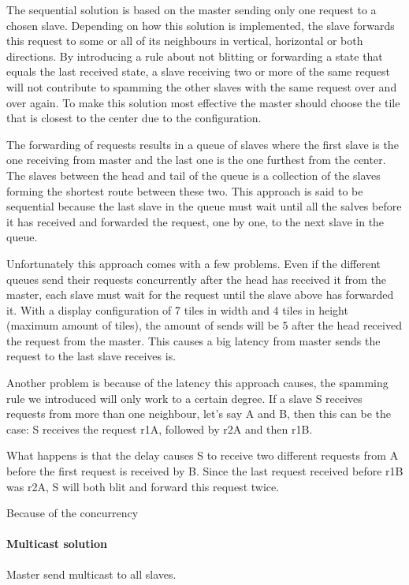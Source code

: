 \documentclass[12pt, a4paper, oneside]{article}
\begin{document}
The sequential solution is based on the master sending only one request to a chosen slave. Depending on how this solution is implemented, the slave forwards this request to some or all of its neighbours in vertical, horizontal or both directions. By introducing a rule about not blitting or forwarding a state that equals the last received state, a slave receiving two or more of the same request will not contribute to spamming the other slaves with the same request over and over again. To make this solution most effective the master should choose the tile that is closest to the center due to the configuration.

The forwarding of requests results in a queue of slaves where the first slave is the one receiving from master and the last one is the one furthest from the center. The slaves between the head and tail of the queue is a collection of the slaves forming the shortest route between these two. 
This approach is said to be sequential because the last slave in the queue must wait until all the salves before it has received and forwarded the request, one by one, to the next slave in the queue.

Unfortunately this approach comes with a few problems. Even if the different queues send their requests concurrently after the head has received it from the master, each slave must wait for the request until the slave above has forwarded it. With a display configuration of 7 tiles in width and 4 tiles in height (maximum amount of tiles), the amount of sends will be 5 after the head received the request from the master. This causes a big latency from master sends the request to the last slave receives is. 

Another problem is because of the latency this approach causes, the spamming rule we introduced will only work to a certain degree. If a slave S receives requests from more than one neighbour, let's say A and B, then this can be the case:
S receives the request r1A, followed by r2A and then r1B.

What happens is that the delay causes S to receive two different requests from A before the first request is received by B. Since the last request received before r1B was r2A, S will both blit and forward this request twice. 

Because of the concurrency

\paragraph{Multicast solution}
Master send multicast to all slaves.
\end{document}
